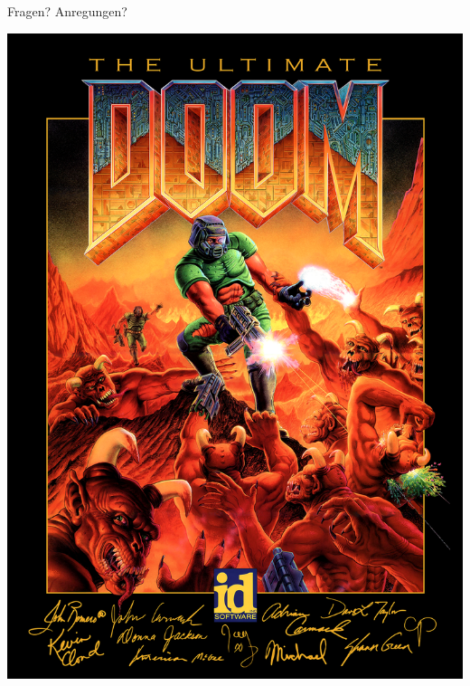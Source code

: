 \begin{frame}{Fragen? Anregungen?}
\begin{center}
\includegraphics[keepaspectratio=true,width=0.40\paperwidth]{doom.png}
\end{center}
 


\end{frame}


